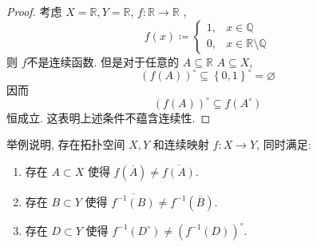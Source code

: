 \documentclass[../main.tex]{subfiles}
\begin{document}
\begin{proof}
  考虑 \(  X= \mathbb{R} , Y= \mathbb{R}   \), \(  f:\mathbb{R} \to \mathbb{R}   \)   ,\[
  f\left( x \right)\coloneqq \begin{cases} 1,&x\in \mathbb{Q} \\ 
   0,&x\in\mathbb{R} \setminus \mathbb{Q}  \end{cases}  
  \] 则 \(  f  \)不是连续函数.  但是对于任意的 \(  A\subseteq \mathbb{R}   \)  \(  A\subseteq X  \), \[
  \left( f\left( A \right)  \right)^{\circ}\subseteq \left\{ 0,1 \right\}^{\circ}= \varnothing 
  \]  因而 \[
  \left( f\left( A \right)  \right)^{\circ}\subseteq f\left( A^{\circ} \right)  
  \]恒成立. 这表明上述条件不蕴含连续性.
\end{proof}
\begin{exercise}{}{}
    
举例说明, 存在拓扑空间 $X, Y$ 和连续映射 $f: X \to Y$, 同时满足:
\begin{enumerate}
    \item 存在 $A \subset X$ 使得 $f(\overline{A}) \neq \overline{f(A)}$.
    \item 存在 $B \subset Y$ 使得 $\overline{f^{-1}(B)} \neq f^{-1}(\overline{B})$.
    \item 存在 $D \subset Y$ 使得 $f^{-1}(D^\circ) \neq (f^{-1}(D))^\circ$.
\end{enumerate}
\end{exercise}
\end{document}
